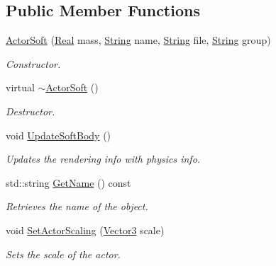 \subsection*{Public Member Functions}
\begin{DoxyCompactItemize}
\item 
\hyperlink{classphys_1_1ActorSoft_af766f6898fb80de4ab98012372a5e6f8}{ActorSoft} (\hyperlink{namespacephys_af7eb897198d265b8e868f45240230d5f}{Real} mass, \hyperlink{namespacephys_aa03900411993de7fbfec4789bc1d392e}{String} name, \hyperlink{namespacephys_aa03900411993de7fbfec4789bc1d392e}{String} file, \hyperlink{namespacephys_aa03900411993de7fbfec4789bc1d392e}{String} group)
\begin{DoxyCompactList}\small\item\em Constructor. \item\end{DoxyCompactList}\item 
virtual \hyperlink{classphys_1_1ActorSoft_a636c145f1e468fd45adc8da2a1708fbe}{$\sim$ActorSoft} ()
\begin{DoxyCompactList}\small\item\em Destructor. \item\end{DoxyCompactList}\item 
void \hyperlink{classphys_1_1ActorSoft_a330e7bacd6250a2a24479561a84ea073}{UpdateSoftBody} ()
\begin{DoxyCompactList}\small\item\em Updates the rendering info with physics info. \item\end{DoxyCompactList}\item 
std::string \hyperlink{classphys_1_1ActorSoft_a2b6bc680d900626275dc5eb3b631acca}{GetName} () const 
\begin{DoxyCompactList}\small\item\em Retrieves the name of the object. \item\end{DoxyCompactList}\item 
void \hyperlink{classphys_1_1ActorSoft_ad1696a10b3057897ca503de013aaddc6}{SetActorScaling} (\hyperlink{classphys_1_1Vector3}{Vector3} scale)
\begin{DoxyCompactList}\small\item\em Sets the scale of the actor. \item\end{DoxyCompactList}\item 

\end{DoxyCompactItemize}
